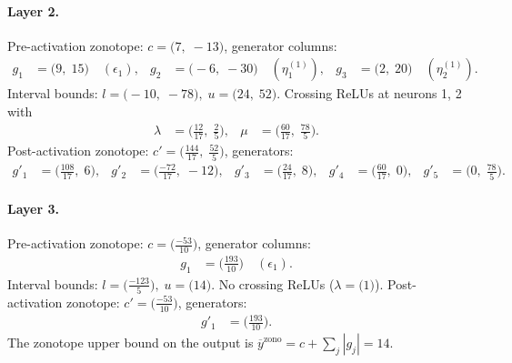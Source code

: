 \documentclass[11pt]{article}
\begin{document}
\paragraph{Layer 2.}
Pre-activation zonotope: $c = \bigl(7,\; -13\bigr)$, generator columns:
\begin{align*}
g_{1} &= \bigl(9,\; 15\bigr) \quad (\epsilon_{1}), &
g_{2} &= \bigl(-6,\; -30\bigr) \quad (\eta^{(1)}_{1}), &
g_{3} &= \bigl(2,\; 20\bigr) \quad (\eta^{(1)}_{2}).
\end{align*}
Interval bounds: $l = \bigl(-10,\; -78\bigr), \; u = \bigl(24,\; 52\bigr)$. 
Crossing ReLUs at neurons 1, 2 with
\begin{align*}
\lambda &= \bigl(\frac{12}{17},\; \frac{2}{5}\bigr), & \mu &= \bigl(\frac{60}{17},\; \frac{78}{5}\bigr).
\end{align*}
Post-activation zonotope: $c' = \bigl(\frac{144}{17},\; \frac{52}{5}\bigr)$, generators:
\begin{align*}
g'_{1} &= \bigl(\frac{108}{17},\; 6\bigr), &
g'_{2} &= \bigl(\frac{-72}{17},\; -12\bigr), &
g'_{3} &= \bigl(\frac{24}{17},\; 8\bigr), &
g'_{4} &= \bigl(\frac{60}{17},\; 0\bigr), &
g'_{5} &= \bigl(0,\; \frac{78}{5}\bigr).
\end{align*}
\paragraph{Layer 3.}
Pre-activation zonotope: $c = \bigl(\frac{-53}{10}\bigr)$, generator columns:
\begin{align*}
g_{1} &= \bigl(\frac{193}{10}\bigr) \quad (\epsilon_{1}).
\end{align*}
Interval bounds: $l = \bigl(\frac{-123}{5}\bigr), \; u = \bigl(14\bigr)$. 
No crossing ReLUs ($\lambda = \bigl(1\bigr)$).
Post-activation zonotope: $c' = \bigl(\frac{-53}{10}\bigr)$, generators:
\begin{align*}
g'_{1} &= \bigl(\frac{193}{10}\bigr).
\end{align*}
The zonotope upper bound on the output is $\overline{y}^{\text{zono}} = c + \sum_j |g_j| = 14$.
\end{document}
